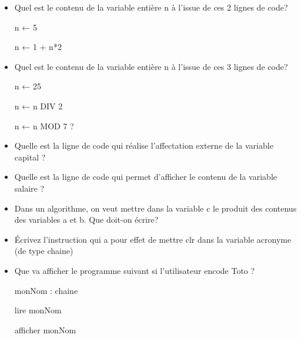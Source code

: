 \documentclass[11pt,a4paper]{article}
\begin{document}
					\begin{itemize}
				
			\item Quel est le contenu de la variable enti\`ere n \`a l'issue de ces 2 lignes de code?\par
				
                    n ← 5\par
				
                    n ← 1 + n*2\par
				 \textcolor{gray}{\underline{\hspace*{2em}}} 
			\item Quel est le contenu de la variable enti\`ere n \`a l'issue de ces 3 lignes de code?\par
				
                    n ← 25\par
				
                    n ← n DIV 2\par
				
                    n ← n MOD 7 ?\par
				 \textcolor{gray}{\underline{\hspace*{1em}}} 
			\item Quelle est la ligne de code qui r\'ealise l'affectation externe de la variable capital ? \textcolor{gray}{\underline{\hspace*{10em}}} 
			\item Quelle est la ligne de code qui permet d'afficher le contenu de la variable salaire ? \textcolor{gray}{\underline{\hspace*{16em}}} 
			\item Dans un algorithme, on veut mettre dans la variable c le produit des contenus des
									  variables a et b. Que doit-on \'ecrire? \textcolor{gray}{\underline{\hspace*{5em}}} 
			\item \'Ecrivez l'instruction qui a pour effet de mettre clr dans la variable acronyme (de type chaine)  \textcolor{gray}{\underline{\hspace*{16em}}} 
			\item Que va afficher le programme suivant si l'utilisateur encode \guillemotleft  Toto \guillemotright  ?\par
				
									  monNom : chaine\par
				
									  lire monNom\par
				
                    afficher \guillemotleft  monNom \guillemotright \par
				 \textcolor{gray}{\underline{\hspace*{5em}}} 
					\end{itemize}
				
\end{document}
